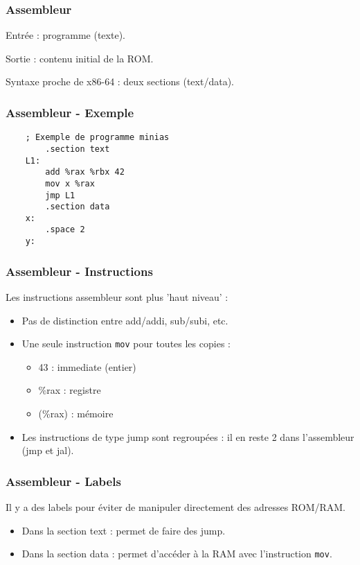 \documentclass[xcolor=pst,10pt,onlymath]{beamer}
\begin{document}
\Large
\begin{frame}
    \frametitle{Assembleur}
    Entrée : programme (texte).
    
    Sortie : contenu initial de la ROM.

    Syntaxe proche de x86-64 : deux sections (text/data).
\end{frame}

\begin{frame}[fragile]
    \frametitle{Assembleur - Exemple}
    \begin{center}
    \begin{lstlisting}
    ; Exemple de programme minias
        .section text
    L1:
        add %rax %rbx 42
        mov x %rax
        jmp L1
        .section data
    x:  
        .space 2
    y:
    \end{lstlisting}
    \end{center}
\end{frame}

\begin{frame}
    \frametitle{Assembleur - Instructions}
    Les instructions assembleur sont plus 'haut niveau' :
    \begin{itemize}
        \item Pas de distinction entre add/addi, sub/subi, etc.
        \item Une seule instruction \texttt{mov} pour toutes les copies :
        \begin{itemize}
            \item 43 : immediate (entier)
            \item \%rax : registre
            \item (\%rax) : mémoire
        \end{itemize}
        \item Les instructions de type jump sont regroupées : il en reste 2 dans l'assembleur (jmp et jal).
    \end{itemize}
\end{frame}

\begin{frame}
    \frametitle{Assembleur - Labels}
    Il y a des labels pour éviter de manipuler directement des adresses ROM/RAM.
    \begin{itemize}
        \item Dans la section text : permet de faire des jump.
        \item Dans la section data : permet d'accéder à la RAM avec l'instruction \texttt{mov}.
    \end{itemize}
\end{frame}
\end{document}
